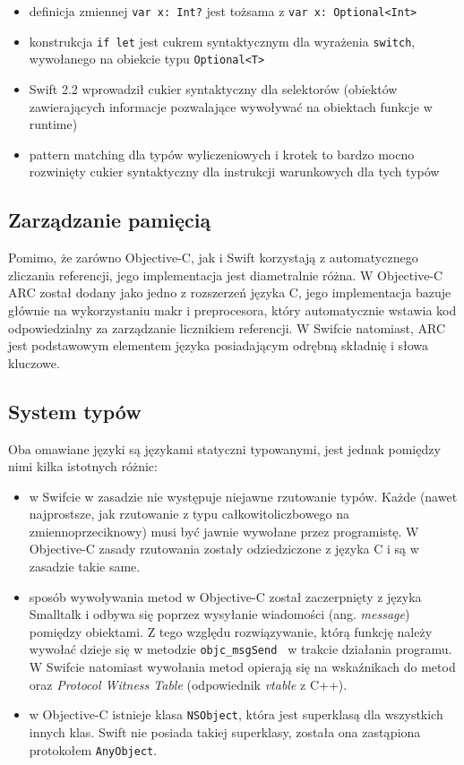 \documentclass[mgr, shortabstract]{iithesis}
\newcommand{\ang}[1]{ang. \textit{#1}}
\begin{document}
\begin{itemize}
    \item definicja zmiennej \texttt{var x: Int?} jest tożsama z \texttt{var x: Optional<Int>}
    \item konstrukcja \texttt{if let} jest cukrem syntaktycznym dla wyrażenia \texttt{switch}, wywołanego na obiekcie typu \texttt{Optional<T>}
    \item Swift 2.2 wprowadził cukier syntaktyczny dla selektorów (obiektów zawierających informacje pozwalające wywoływać na obiektach funkcje w runtime)
    \item pattern matching dla typów wyliczeniowych i krotek to bardzo mocno rozwinięty cukier syntaktyczny dla instrukcji warunkowych dla tych typów
\end{itemize}

\subsection{Zarządzanie pamięcią}

Pomimo, że zarówno Objective-C, jak i Swift korzystają z automatycznego zliczania referencji, jego implementacja jest diametralnie różna. W Objective-C ARC został dodany jako jedno z rozszerzeń języka C, jego implementacja bazuje głównie na wykorzystaniu makr i preprocesora, który automatycznie wstawia kod odpowiedzialny za zarządzanie licznikiem referencji. W Swifcie natomiast, ARC jest podstawowym elementem języka posiadającym odrębną składnię i słowa kluczowe.

\subsection{System typów}
\label{s:system_typow}

Oba omawiane języki są językami statyczni typowanymi, jest jednak pomiędzy nimi kilka istotnych różnic:

\begin{itemize}

    \item w Swifcie w zasadzie nie występuje niejawne rzutowanie typów. Każde (nawet najprostsze, jak rzutowanie z typu całkowitoliczbowego na zmiennoprzeciknowy) musi być jawnie wywołane przez programistę. W Objective-C zasady rzutowania zostały odziedziczone z języka C i są w zasadzie takie same.
    \item sposób wywoływania metod w Objective-C został zaczerpnięty z języka Smalltalk i odbywa się poprzez wysyłanie wiadomości (\ang{message}) pomiędzy obiektami. Z tego względu rozwiązywanie, którą funkcję należy wywołać dzieje się w metodzie \texttt{objc_msgSend } w trakcie działania programu. W Swifcie natomiast wywołania metod opierają się na wskaźnikach do metod oraz \textit{Protocol Witness Table} (odpowiednik \textit{vtable} z C++).
    \item w Objective-C istnieje klasa \texttt{NSObject}, która jest superklasą dla wszystkich innych klas. Swift nie posiada takiej superklasy, została ona zastąpiona protokołem \texttt{AnyObject}.

\end{itemize}
\end{document}
